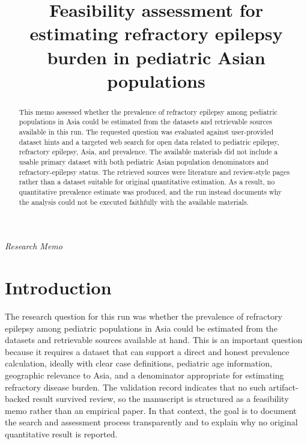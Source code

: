 \documentclass[11pt]{article}
\title{Feasibility assessment for estimating refractory epilepsy burden in pediatric Asian populations}
\author{}
\date{}
\begin{document}
\maketitle

\begin{center}\small\textit{Research Memo}\end{center}

\begin{abstract}

This memo assessed whether the prevalence of refractory epilepsy among pediatric populations in Asia could be estimated from the datasets and retrievable sources available in this run. The requested question was evaluated against user-provided dataset hints and a targeted web search for open data related to pediatric epilepsy, refractory epilepsy, Asia, and prevalence. The available materials did not include a usable primary dataset with both pediatric Asian population denominators and refractory-epilepsy status. The retrieved sources were literature and review-style pages rather than a dataset suitable for original quantitative estimation. As a result, no quantitative prevalence estimate was produced, and the run instead documents why the analysis could not be executed faithfully with the available materials.

\end{abstract}

\section{Introduction}
The research question for this run was whether the prevalence of refractory epilepsy among pediatric populations in Asia could be estimated from the datasets and retrievable sources available at hand. This is an important question because it requires a dataset that can support a direct and honest prevalence calculation, ideally with clear case definitions, pediatric age information, geographic relevance to Asia, and a denominator appropriate for estimating refractory disease burden. The validation record indicates that no such artifact-backed result survived review, so the manuscript is structured as a feasibility memo rather than an empirical paper. In that context, the goal is to document the search and assessment process transparently and to explain why no original quantitative result is reported.
\end{document}
